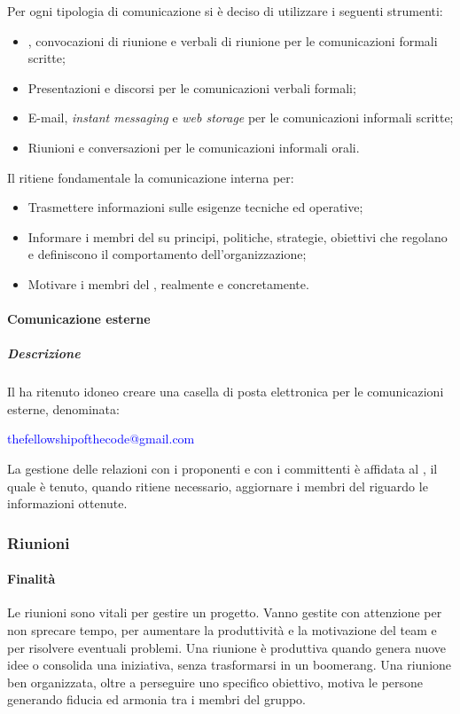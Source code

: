 Per ogni tipologia di comunicazione si è deciso di utilizzare i seguenti strumenti:
\begin{itemize}
\item
\textit{\Pdp}, convocazioni di riunione e verbali di riunione per le comunicazioni formali scritte;
\item
Presentazioni e discorsi per le comunicazioni verbali formali; 
\item
E-mail, \textit{instant messaging} e \textit{web storage} per le comunicazioni informali scritte;
\item
Riunioni e conversazioni per le comunicazioni informali orali.
\end{itemize}

Il  ritiene fondamentale la comunicazione interna per:
\begin{itemize}
\item
Trasmettere informazioni sulle esigenze tecniche ed operative;
\item
Informare i membri del  su principi, politiche, strategie, obiettivi che regolano e definiscono il comportamento dell'organizzazione;
\item
Motivare i membri del , realmente e concretamente.
\end{itemize}


\paragraph{Comunicazione esterne}
\subparagraph{Descrizione}
Il  ha ritenuto idoneo creare una casella di posta elettronica per le comunicazioni esterne, denominata:

\begin{center} \textcolor{blue}{thefellowshipofthecode@gmail.com} \end{center}

La gestione delle relazioni con i proponenti e con i committenti è affidata al \textit{\RdP}, il quale è tenuto, quando ritiene necessario, aggiornare i membri del 	 riguardo le informazioni ottenute. 


\subsubsection{Riunioni}

\paragraph{Finalità}
Le riunioni sono vitali per gestire un progetto. Vanno gestite con attenzione per non sprecare tempo, per aumentare la produttività e la motivazione del team e per risolvere eventuali problemi. Una riunione è produttiva quando genera nuove idee o consolida una iniziativa, senza trasformarsi in un boomerang.
Una riunione ben organizzata, oltre a perseguire uno specifico obiettivo, motiva le persone generando fiducia ed armonia tra i membri del gruppo.
 
